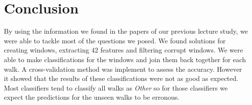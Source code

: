 \section{Conclusion}
By using the information we found in the papers of our previous lecture study, we were able to tackle most of the questions we posed. We found solutions for  creating windows, extracting 42 features and filtering corrupt windows. We were able to make classifications for the windows and join them back together for each walk. A cross-validation method was implement to assess the accuracy. However it showed that the results of these classifications were not as good as expected. Most classifiers tend to classify all walks as \textit{Other} so for those classifiers we expect the predictions for the unseen walks to be erronous. 